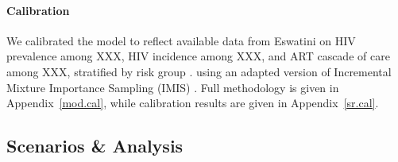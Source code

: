 \paragraph{Calibration}
We calibrated the model to reflect
available data from Eswatini on HIV prevalence among XXX, HIV incidence among XXX, and ART cascade of care among XXX,
stratified by risk group \cite{SDHS2006,SHIMS1,SHIMS2,SHIMS3,Baral2014,EswKP2014,EswIBBS2022}.
using an adapted version of Incremental Mixture Importance Sampling (IMIS) \cite{Raftery2010}.
Full methodology is given in Appendix~\ref{mod.cal},
while calibration results are given in Appendix~\ref{sr.cal}.
\subsection{Scenarios \& Analysis}\label{art.meth.obj}
